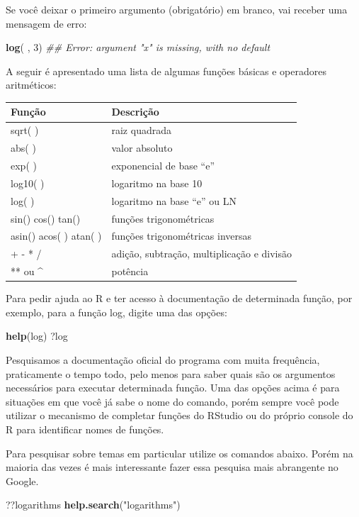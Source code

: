 \documentclass[
  11pt,
  a5paper,
  openany]{book}
\newenvironment{Shaded}{\begin{snugshade}}{\end{snugshade}}
\newcommand{\CommentTok}[1]{\textcolor[rgb]{0.56,0.35,0.01}{\textit{#1}}}
\newcommand{\DecValTok}[1]{\textcolor[rgb]{0.00,0.00,0.81}{#1}}
\newcommand{\KeywordTok}[1]{\textcolor[rgb]{0.13,0.29,0.53}{\textbf{#1}}}
\newcommand{\NormalTok}[1]{#1}
\newcommand{\StringTok}[1]{\textcolor[rgb]{0.31,0.60,0.02}{#1}}
\begin{document}
Se você deixar o primeiro argumento (obrigatório) em branco, vai receber uma mensagem de erro:

\begin{Shaded}
\begin{Highlighting}[]
\KeywordTok{log}\NormalTok{( , }\DecValTok{3}\NormalTok{)}
\CommentTok{## Error: argument "x" is missing, with no default}
\end{Highlighting}
\end{Shaded}

A seguir é apresentado uma lista de algumas funções básicas e operadores aritméticos:

\begin{longtable}[]{@{}ll@{}}
\toprule
Função & Descrição\tabularnewline
\midrule
\endhead
sqrt( ) & raiz quadrada\tabularnewline
abs( ) & valor absoluto\tabularnewline
exp( ) & exponencial de base ``e''\tabularnewline
log10( ) & logaritmo na base 10\tabularnewline
log( ) & logaritmo na base ``e'' ou LN\tabularnewline
sin() cos() tan() & funções trigonométricas\tabularnewline
asin() acos( ) atan( ) & funções trigonométricas inversas\tabularnewline
+ - * / & adição, subtração, multiplicação e divisão\tabularnewline
** ou \^{} & potência\tabularnewline
\bottomrule
\end{longtable}

Para pedir ajuda ao R e ter acesso à documentação de determinada função, por exemplo, para a função log, digite uma das opções:

\begin{Shaded}
\begin{Highlighting}[]
\KeywordTok{help}\NormalTok{(log)           }
\NormalTok{?log}
\end{Highlighting}
\end{Shaded}

Pesquisamos a documentação oficial do programa com muita frequência, praticamente o tempo todo, pelo menos para saber quais são os argumentos necessários para executar determinada função. Uma das opções acima é para situações em que você já sabe o nome do comando, porém sempre você pode utilizar o mecanismo de completar funções do RStudio ou do próprio console do R para identificar nomes de funções.

Para pesquisar sobre temas em particular utilize os comandos abaixo. Porém na maioria das vezes é mais interessante fazer essa pesquisa mais abrangente no Google.

\begin{Shaded}
\begin{Highlighting}[]
\NormalTok{??logarithms}
\KeywordTok{help.search}\NormalTok{(}\StringTok{"logarithms"}\NormalTok{)}
\end{Highlighting}
\end{Shaded}
\end{document}
